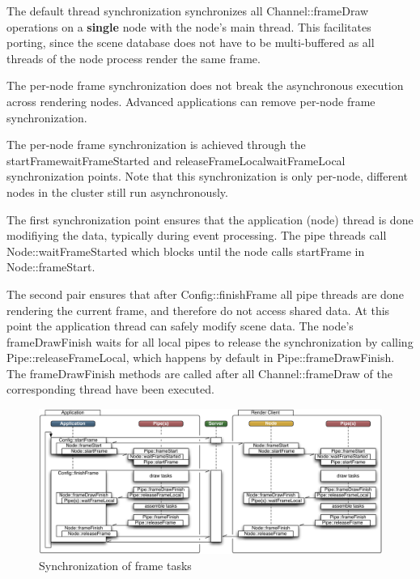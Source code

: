 \documentclass[10pt,a4]{scrartcl}
\begin{document}
The default thread synchronization synchronizes all
\textsf{Channel::frameDraw} operations on a \textbf{single} node with
the node's main thread. This facilitates porting, since the scene
database does not have to be multi-buffered as all threads of the node
process render the same frame.

The per-node frame synchronization does not break the asynchronous
execution across rendering nodes.  Advanced applications can remove per-node
frame synchronization.

The per-node frame synchronization is achieved through the
\textsf{startFrame\textrightarrow wait\-Fra\-me\-Started} and
\textsf{releaseFrameLocal\textrightarrow waitFrameLocal} synchronization
points. Note that this synchronization is only per-node, different nodes
in the cluster still run asynchronously.

The first synchronization point ensures that the application (node)
thread is done modifiying the data, typically during event
processing. The pipe threads call \textsf{Node::waitFrameStarted} which
blocks until the node calls \textsf{startFrame} in
\textsf{Node::frame\-Start}.

The second pair ensures that after \textsf{Config::finishFrame} all pipe
threads are done rendering the current frame, and therefore do not
access shared data. At this point the application thread can safely
modify scene data. The node's \textsf{frameDrawFinish} waits for all
local pipes to release the synchronization by calling
\textsf{Pipe::release\-Fra\-me\-Lo\-cal}, which happens by default in
\textsf{Pipe::frameDrawFinish}. The \textsf{frameDrawFinish} methods are
called after all \textsf{Channel::frameDraw} of the corresponding thread
have been executed.

\begin{figure}[ht!]\center
  \includegraphics[width=\textwidth]{images/mainloop.pdf}
  {\caption{\small\label{fFrameSync}Synchronization of frame tasks}}
\end{figure}
\end{document}
